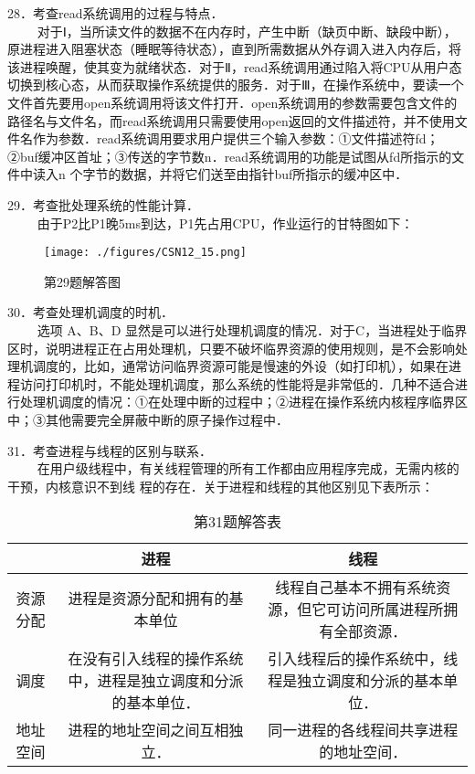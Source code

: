 28．考查read系统调用的过程与特点．\\
$\qquad$ 对于Ⅰ，当所读文件的数据不在内存时，产生中断（缺页中断、缺段中断），原进程进入阻塞状态（睡眠等待状态），直到所需数据从外存调入进入内存后，将该进程唤醒，使其变为就绪状态．对于Ⅱ，read系统调用通过陷入将CPU从用户态切换到核心态，从而获取操作系统提供的服务．对于Ⅲ，在操作系统中，要读一个文件首先要用open系统调用将该文件打开．open系统调用的参数需要包含文件的路径名与文件名，而read系统调用只需要使用open返回的文件描述符，并不使用文件名作为参数．read系统调用要求用户提供三个输入参数：①文件描述符fd；②buf缓冲区首址；③传送的字节数n．read系统调用的功能是试图从fd所指示的文件中读入n 个字节的数据，并将它们送至由指针buf所指示的缓冲区中．

29．考查批处理系统的性能计算．\\
$\qquad$ 由于P2比P1晚5ms到达，P1先占用CPU，作业运行的甘特图如下：
\begin{figure}[ht]
\centering
\texttt{[image: ./figures/CSN12\_15.png]}
\caption{第29题解答图} \label{CSN12_fig15}
\end{figure}

30．考查处理机调度的时机．\\
$\qquad$ 选项 A、B、D 显然是可以进行处理机调度的情况．对于C，当进程处于临界区时，说明进程正在占用处理机，只要不破坏临界资源的使用规则，是不会影响处理机调度的，比如，通常访问临界资源可能是慢速的外设（如打印机），如果在进程访问打印机时，不能处理机调度，那么系统的性能将是非常低的．几种不适合进行处理机调度的情况：①在处理中断的过程中；②进程在操作系统内核程序临界区中；③其他需要完全屏蔽中断的原子操作过程中．

31．考查进程与线程的区别与联系．\\
$\qquad$ 在用户级线程中，有关线程管理的所有工作都由应用程序完成，无需内核的干预，内核意识不到线
程的存在．关于进程和线程的其他区别见下表所示：
\begin{table}[ht]
\centering
\caption{第31题解答表}\label{CSN12_tab7}
\begin{tabular}{|c|c|c|}
\hline
 & 进程 & 线程 \\
\hline
资源分配 & 进程是资源分配和拥有的基本单位 & 线程自己基本不拥有系统资源，但它可访问所属进程所拥有全部资源． \\
\hline
调度 & 在没有引入线程的操作系统中，进程是独立调度和分派的基本单位． & 引入线程后的操作系统中，线程是独立调度和分派的基本单位． \\
\hline
地址空间 & 进程的地址空间之间互相独立． & 同一进程的各线程间共享进程的地址空间． \\
\hline
\end{tabular}
\end{table}

